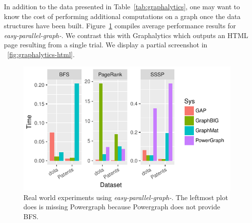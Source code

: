 \documentclass[conference]{IEEEtran}
\begin{document}

In addition to the data presented in Table~\ref{tab:graphalytics}, one may want to know the cost of performing additional computations on a graph once the data structures have been built. Figure~\ref{fig:epg-realworld} compiles average performance results for \emph{easy-parallel-graph-\textasteriskcentered}. We contrast this with Graphalytics which outputs an HTML page resulting from a single trial. We display a partial screenshot in \figurename~\ref{fig:graphalytics-html}.

\begin{figure}
	\centering
	\includegraphics[width=\linewidth, trim=0 18pt 6pt 0pt, clip]{graphics/compare-realworld.pdf}
	\caption{Real world experiments using \emph{easy-parallel-graph-\textasteriskcentered}. The leftmost plot does is missing Powergraph because Powergraph does not provide BFS.}
	\label{fig:epg-realworld}
\end{figure}
\end{document}
